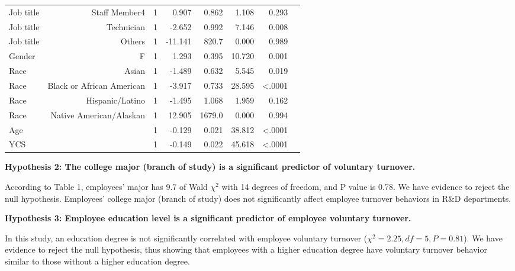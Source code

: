 \begin{table}[]
\begin{tabular}{lrrrrrrr}
		Job title & Staff Member4             & 1  & 0.907    & 0.862          & 1.108                    & 0.293                               \\
		Job title & Technician                & 1  & -2.652   & 0.992          & 7.146                    & 0.008                               \\
		Job title & Others                    & 1  & -11.141  & 820.7          & 0.000                    & 0.989                               \\
		Gender    & F                         & 1  & 1.293    & 0.395          & 10.720                   & 0.001                               \\
		Race      & Asian                     & 1  & -1.489   & 0.632          & 5.545                    & 0.019                               \\
		Race      & Black or African American & 1  & -3.917   & 0.733          & 28.595                   & \textless.0001                      \\
		Race      & Hispanic/Latino           & 1  & -1.495   & 1.068          & 1.959                    & 0.162                               \\
		Race      & Native American/Alaskan   & 1  & 12.905   & 1679.0         & 0.000                    & 0.994                               \\
		Age       &                           & 1  & -0.129   & 0.021          & 38.812                   & \textless.0001                      \\
		YCS       &                           & 1  & -0.149   & 0.022          & 45.618                   & \textless.0001  \\ \bottomrule                   
	\end{tabular}
\end{table}

\textbf{Hypothesis 2: The college major (branch of study) is a significant predictor of voluntary turnover. }

According to Table 1, employees' major has 9.7 of Wald $\chi^2$ with 14 degrees of freedom, and P value is 0.78. We have evidence to reject the null hypothesis. Employees' college major (branch of study) does not significantly affect employee turnover behaviors in R\&D departments. 

\textbf{Hypothesis 3: Employee education level is a significant predictor of employee voluntary turnover.}

In this study, an education degree is not significantly correlated with employee voluntary turnover ($\chi^2=2.25, df=5, P=0.81$). We have evidence to reject the null hypothesis, thus showing that employees with a higher education degree have voluntary turnover behavior similar to those without a higher education degree. 

